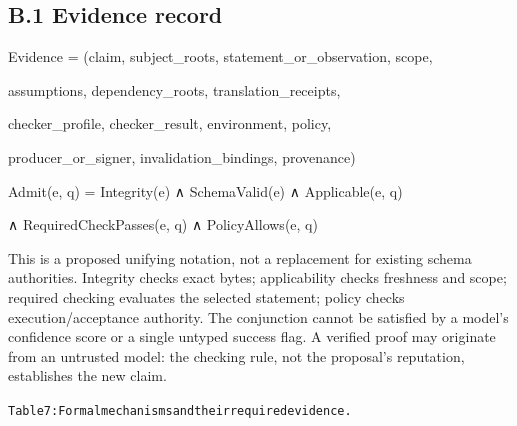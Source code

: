 \subsection*{B.1 Evidence record}

\noindent Evidence = (claim, subject\_roots, statement\_or\_observation, scope,\par
\noindent assumptions, dependency\_roots, translation\_receipts,\par
\noindent checker\_profile, checker\_result, environment, policy,\par
\noindent producer\_or\_signer, invalidation\_bindings, provenance)\par
\noindent Admit(e, q) = Integrity(e) ∧ SchemaValid(e) ∧ Applicable(e, q)\par
\noindent ∧ RequiredCheckPasses(e, q) ∧ PolicyAllows(e, q)\par

This is a proposed unifying notation, not a replacement for existing schema authorities. Integrity
checks exact bytes; applicability checks freshness and scope; required checking evaluates the selected
statement; policy checks execution/acceptance authority. The conjunction cannot be satisfied by a
model’s confidence score or a single untyped success flag. A verified proof may originate from an
untrusted model: the checking rule, not the proposal’s reputation, establishes the new claim.


\begingroup\fontsize{7}{8.4}\selectfont
\begin{alltt}
Table 7: Formal mechanisms and their required evidence.
\end{alltt}\endgroup

